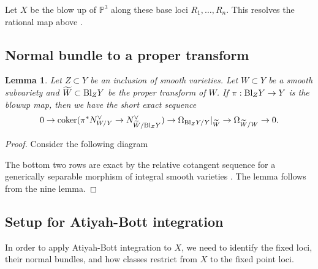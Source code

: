 \documentclass[12 pt, reqno]{amsart}
\newtheorem{lem}[thm]{Lemma}
\theoremstyle{definition}
\newcommand{\on}{\operatorname}
\newcommand{\mb}{\mathbb}
\newcommand{\wt}{\widetilde}
\begin{document}
Let $X$ be the blow up of $\mb{P}^3$ along these base loci
$R_1,\ldots,R_n$. This resolves the rational map above
\cite[Proposition 1.2]{AF93}.

\subsection{Normal bundle to a proper transform}
\begin{lem}
\label{SES}
Let $Z\subset Y$ be an inclusion of smooth varieties. Let $W\subset Y$
be a smooth subvariety and $\wt{W}\subset {\rm Bl}_Z Y$ be the proper
transform of $W$. If $\pi: {\rm Bl}_Z Y\to Y$ is the blowup map, then
we have the short exact sequence
\begin{align*}
  0\to \on{coker}(\pi^{*}N_{W/Y}^\vee \to N_{\wt{W}/{\rm Bl}_Z Y}^\vee)\to \Omega_{{\rm Bl}_Z Y/Y}|_{\wt{W}}\to  \Omega_{\wt{W}/W}\to 0. 
\end{align*}
\end{lem}

\begin{proof}
Consider the following diagram
\begin{center}
\end{center}
The bottom two rows are exact by the relative cotangent sequence for a
generically separable morphism of integral smooth varieties
\cite[Remark 4.17]{Liu}. The lemma follows from the nine lemma.
\end{proof}

\subsection{Setup for Atiyah-Bott integration}
In order to apply Atiyah-Bott integration to $X$, we need to identify
the fixed loci, their normal bundles, and how classes restrict from
$X$ to the fixed point loci.
\end{document}
